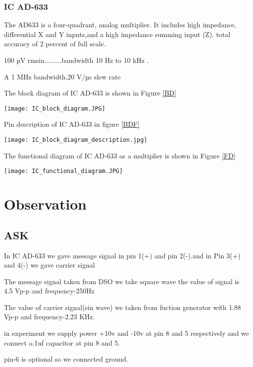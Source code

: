 \documentclass{article}
\begin{document}
\subsubsection{IC AD-633}
The AD633 is a four-quadrant, analog multiplier. It includes high impedance, differential X and Y inputs,and a high impedance summing input (Z). 
total accuracy of 2 percent of full scale.\par 100 µV rmsin.........bandwidth 10 Hz to 10 kHz . \par A 1 MHz bandwidth,20 V/µs slew rate \par
The block diagram of IC AD-633 is shown in Figure \ref{BD} 
\begin{figure*}[ht]
	\centering
	\texttt{[image: IC\_block\_diagram.JPG]}
	\caption{Block diagram of IC AD-633}
	\label{BD}
\end{figure*}


Pin description of IC AD-633 in figure \ref{BDF} 
\begin{figure*}[ht]
	\centering
	\texttt{[image: IC\_block\_diagram\_description.jpg]}
	\caption{Description of different pin of IC AD-633}
	\label{BDF}
\end{figure*}
 
 
The functional diagram of IC AD-633 as a multiplier is shown in Figure \ref{FD}
\begin{figure*}[ht]
	\centering
	\texttt{[image: IC\_functional\_diagram.JPG]}
	\caption{Functional diagram of IC AD-633 as a multiplier}
	\label{FD}
\end{figure*}



\section{Observation}
\subsection{ASK}
In IC AD-633 we gave message signal in pin 1(+) and pin 2(-).and in Pin 3(+) and 4(-) we gave carrier signal\par
The  message signal taken from DSO we take square wave the value of signal is 4.5 Vp-p and frequency-250Hz\par
The value of carrier signal(sin wave) we taken from fuction generator with 1.88 Vp-p and frequency-2.23 KHz.\par
in experiment we supply power +10v and -10v at pin 8 and 5 respectively and we connect o.1uf capacitor at pin 8 and 5.\par
pin-6 is optional so we connected ground.\par
\end{document}
